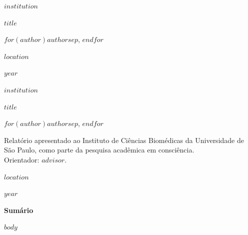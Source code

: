 \usepackage{fontspec}
\setmainfont{Times New Roman}
\usepackage{polyglossia}
\setdefaultlanguage{portuguese}
\usepackage{setspace}
\onehalfspacing
\usepackage[left=3cm,right=2cm,top=3cm,bottom=2cm]{geometry}
\usepackage{hyperref}
\hypersetup{hidelinks}
\usepackage{tocloft}
\setlength\cftbeforesecskip{6pt}
\usepackage{titlesec}
\titleformat{\section}{\bfseries\normalsize}{\thesection}{0.6em}{}
\titleformat{\subsection}{\normalsize}{\thesubsection}{0.6em}{}
\usepackage{fancyhdr}
\pagestyle{fancy}
\fancyhf{}
\fancyhead[R]{\thepage}
\renewcommand{\headrulewidth}{0pt}
\newcommand{\ABNTTitle}{$title$}
\newcommand{\ABNTAuthor}{$for(author)$$author$$sep$, $endfor$}
\newcommand{\ABNTAdvisor}{$advisor$}
\newcommand{\ABNTInstit}{$institution$}
\newcommand{\ABNTCity}{$location$}
\newcommand{\ABNTYear}{$year$}

\thispagestyle{empty}
\begin{center}
{\large \textbf{\ABNTInstit}\par}
\vfill
{\LARGE \textbf{\ABNTTitle}\par}
\vfill
{\large \ABNTAuthor\par}
\vfill
{\large \ABNTCity\par}
{\large \ABNTYear\par}
\end{center}
\clearpage
\thispagestyle{empty}
\begin{center}
{\large \textbf{\ABNTInstit}\par}
\vfill
{\LARGE \textbf{\ABNTTitle}\par}
\vspace{1.5em}
{\large \ABNTAuthor\par}
\vspace{2em}
\begin{minipage}{0.75\textwidth}
\noindent Relatório apresentado ao Instituto de Ciências Biomédicas da Universidade de São Paulo, como parte da pesquisa acadêmica em consciência.\\
\noindent Orientador: \ABNTAdvisor.
\end{minipage}
\vfill
{\large \ABNTCity\par}
{\large \ABNTYear\par}
\end{center}
\clearpage
{\bfseries\large Sumário}\par
\tableofcontents
\clearpage
\setcounter{page}{1}
$body$


\usepackage{longtable}
\usepackage{booktabs}
\usepackage{array}
\usepackage{multirow}
\raggedbottom

